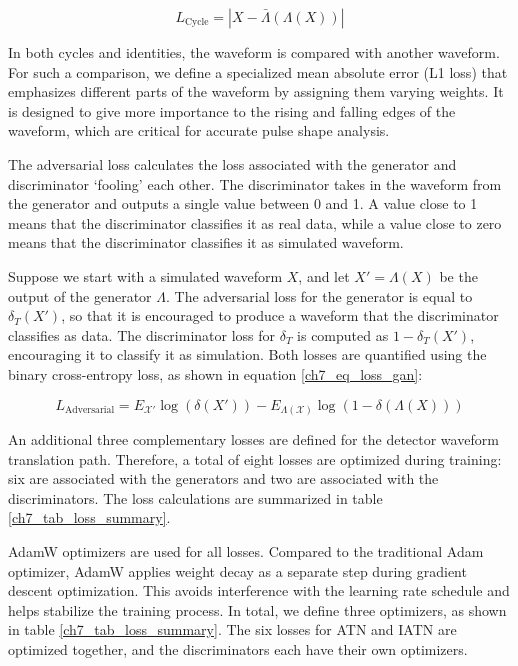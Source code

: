 \begin{equation}\label{eq:loss_cyc}
    L_{\mathrm{Cycle}} = |X - \bar{\Lambda}(\Lambda(X))|
\end{equation}

In both cycles and identities, the waveform is compared with another waveform. For such a comparison, we define a specialized mean absolute error (L1 loss) that emphasizes different parts of the waveform by assigning them varying weights. It is designed to give more importance to the rising and falling edges of the waveform, which are critical for accurate pulse shape analysis.

The adversarial loss calculates the loss associated with the generator and discriminator `fooling' each other. The discriminator takes in the waveform from the generator and outputs a single value between 0 and 1. A value close to 1 means that the discriminator classifies it as real data, while a value close to zero means that the discriminator classifies it as simulated waveform. 

Suppose we start with a simulated waveform $X$, and let $X' = \Lambda(X)$ be the output of the generator $\Lambda$. The adversarial loss for the generator is equal to $\delta_T(X')$, so that it is encouraged to produce a waveform that the discriminator classifies as data. The discriminator loss for $\delta_T$ is computed as $1 - \delta_T(X')$, encouraging it to classify it as simulation. Both losses are quantified using the binary cross-entropy loss, as shown in equation \ref{ch7_eq_loss_gan}:

\begin{equation}\label{ch7_eq_loss_gan}
    L_{\mathrm{Adversarial}} = E_{\mathcal{X'}}\log(\delta(X')) - E_{\Lambda(\mathcal{X})}\log(1 - \delta(\Lambda(X)))
\end{equation}

An additional three complementary losses are defined for the detector waveform translation path. Therefore, a total of eight losses are optimized during training: six are associated with the generators and two are associated with the discriminators. The loss calculations are summarized in table \ref{ch7_tab_loss_summary}.



AdamW \cite{adam_w_paper} optimizers are used for all losses. Compared to the traditional Adam optimizer, AdamW applies weight decay as a separate step during gradient descent optimization. This avoids interference with the learning rate schedule and helps stabilize the training process. In total, we define three optimizers, as shown in table \ref{ch7_tab_loss_summary}. The six losses for ATN and IATN are optimized together, and the discriminators each have their own optimizers.

